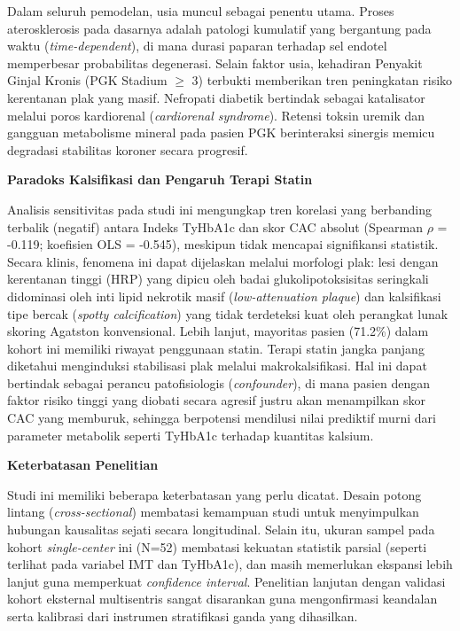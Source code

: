 \documentclass[
  indonesian,
]{agujournal2019}
\begin{document}
Dalam seluruh pemodelan, usia muncul sebagai penentu utama. Proses
aterosklerosis pada dasarnya adalah patologi kumulatif yang bergantung
pada waktu (\emph{time-dependent}), di mana durasi paparan terhadap sel
endotel memperbesar probabilitas degenerasi. Selain faktor usia,
kehadiran Penyakit Ginjal Kronis (PGK Stadium \(\ge\) 3) terbukti
memberikan tren peningkatan risiko kerentanan plak yang masif. Nefropati
diabetik bertindak sebagai katalisator melalui poros kardiorenal
(\emph{cardiorenal syndrome}). Retensi toksin uremik dan gangguan
metabolisme mineral pada pasien PGK berinteraksi sinergis memicu
degradasi stabilitas koroner secara progresif.

\textbf{Paradoks Kalsifikasi dan Pengaruh Terapi Statin}

Analisis sensitivitas pada studi ini mengungkap tren korelasi yang
berbanding terbalik (negatif) antara Indeks TyHbA1c dan skor CAC absolut
(Spearman \(\rho\) = -0.119; koefisien OLS = -0.545), meskipun tidak
mencapai signifikansi statistik. Secara klinis, fenomena ini dapat
dijelaskan melalui morfologi plak: lesi dengan kerentanan tinggi (HRP)
yang dipicu oleh badai glukolipotoksisitas seringkali didominasi oleh
inti lipid nekrotik masif (\emph{low-attenuation plaque}) dan
kalsifikasi tipe bercak (\emph{spotty calcification}) yang tidak
terdeteksi kuat oleh perangkat lunak skoring Agatston konvensional.
Lebih lanjut, mayoritas pasien (71.2\%) dalam kohort ini memiliki
riwayat penggunaan statin. Terapi statin jangka panjang diketahui
menginduksi stabilisasi plak melalui makrokalsifikasi. Hal ini dapat
bertindak sebagai perancu patofisiologis (\emph{confounder}), di mana
pasien dengan faktor risiko tinggi yang diobati secara agresif justru
akan menampilkan skor CAC yang memburuk, sehingga berpotensi mendilusi
nilai prediktif murni dari parameter metabolik seperti TyHbA1c terhadap
kuantitas kalsium.

\textbf{Keterbatasan Penelitian}

Studi ini memiliki beberapa keterbatasan yang perlu dicatat. Desain
potong lintang (\emph{cross-sectional}) membatasi kemampuan studi untuk
menyimpulkan hubungan kausalitas sejati secara longitudinal. Selain itu,
ukuran sampel pada kohort \emph{single-center} ini (N=52) membatasi
kekuatan statistik parsial (seperti terlihat pada variabel IMT dan
TyHbA1c), dan masih memerlukan ekspansi lebih lanjut guna memperkuat
\emph{confidence interval}. Penelitian lanjutan dengan validasi kohort
eksternal multisentris sangat disarankan guna mengonfirmasi keandalan
serta kalibrasi dari instrumen stratifikasi ganda yang dihasilkan.
\end{document}
